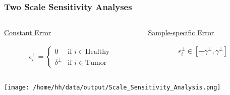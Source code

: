 \documentclass[11pt]{beamer}
\begin{document}
\begin{frame}
  \frametitle{Two Scale Sensitivity Analyses}

     \begin{columns}
     \begin{column}{0.5\textwidth}
      \begin{center}
        \underline{Constant Error}

        \begin{align*}
          \epsilon^\perp_i = \begin{cases}
            0 & \text{if } i \in \text{Healthy} \\
            \delta^\perp & \text{if } i \in \text{Tumor}
          \end{cases}
        \end{align*}
      \end{center}
    \end{column}
    \vrule{}
    \begin{column}{0.5\textwidth}  %
      \vspace{5px}
      \begin{center}
        \underline{Sample-specific Error}
        
         \begin{align*}
          \epsilon^\perp_i \in [-\gamma^\perp,\gamma^\perp]
         \end{align*}
         \vspace{1px}
      \end{center}
    \end{column}
   \end{columns}

     \begin{center}
       \texttt{[image: /home/hh/data/output/Scale\_Sensitivity\_Analysis.png]}
     \end{center}
\end{frame}
\end{document}
